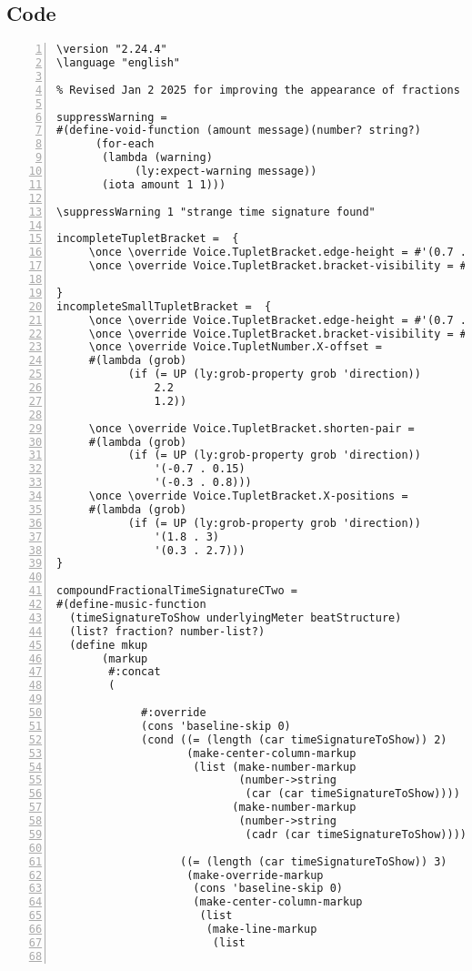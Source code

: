 \subsection{Code}
\begin{Verbatim}[numbers=left,xleftmargin=5mm]
\version "2.24.4"
\language "english"

% Revised Jan 2 2025 for improving the appearance of fractions

suppressWarning =
#(define-void-function (amount message)(number? string?)
      (for-each
       (lambda (warning)
            (ly:expect-warning message))
       (iota amount 1 1)))

\suppressWarning 1 "strange time signature found"

incompleteTupletBracket =  {
     \once \override Voice.TupletBracket.edge-height = #'(0.7 . 0)
     \once \override Voice.TupletBracket.bracket-visibility = ##t

}
incompleteSmallTupletBracket =  {
     \once \override Voice.TupletBracket.edge-height = #'(0.7 . 0)
     \once \override Voice.TupletBracket.bracket-visibility = ##t
     \once \override Voice.TupletNumber.X-offset =
     #(lambda (grob)
           (if (= UP (ly:grob-property grob 'direction))
               2.2
               1.2))

     \once \override Voice.TupletBracket.shorten-pair =
     #(lambda (grob)
           (if (= UP (ly:grob-property grob 'direction))
               '(-0.7 . 0.15)
               '(-0.3 . 0.8)))
     \once \override Voice.TupletBracket.X-positions =
     #(lambda (grob)
           (if (= UP (ly:grob-property grob 'direction))
               '(1.8 . 3)
               '(0.3 . 2.7)))
}

compoundFractionalTimeSignatureCTwo =
#(define-music-function
  (timeSignatureToShow underlyingMeter beatStructure)
  (list? fraction? number-list?)
  (define mkup
       (markup
        #:concat
        (

             #:override
             (cons 'baseline-skip 0)
             (cond ((= (length (car timeSignatureToShow)) 2)
                    (make-center-column-markup
                     (list (make-number-markup
                            (number->string
                             (car (car timeSignatureToShow))))
                           (make-number-markup
                            (number->string
                             (cadr (car timeSignatureToShow)))))))

                   ((= (length (car timeSignatureToShow)) 3)
                    (make-override-markup
                     (cons 'baseline-skip 0)
                     (make-center-column-markup
                      (list
                       (make-line-markup
                        (list


\end{Verbatim}
